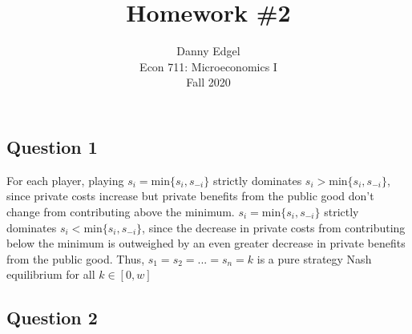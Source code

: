 \documentclass{article}
\begin{document}
\title{	Homework \#2 }
\author{ 	Danny Edgel 					\\ 
			Econ 711: Microeconomics I		\\
			Fall 2020						\\
		}
\maketitle\thispagestyle{empty}



\subsection*{Question 1}
For each player, playing ${s_i=\text{min}\{s_i,s_{-i}\}}$ strictly dominates ${s_i>\text{min}\{s_i,s_{-i}\}}$, since private costs increase but private benefits from the public good don't change from contributing above the minimum. ${s_i=\text{min}\{s_i,s_{-i}\}}$ strictly dominates ${s_i<\text{min}\{s_i,s_{-i}\}}$, since the decrease in private costs from contributing below the minimum is outweighed by an even greater decrease in private benefits from the public good. Thus, ${s_1=s_2=...=s_n=k}$ is a pure strategy Nash equilibrium for all $k\in[0,w]$



\subsection*{Question 2}
\end{document}
